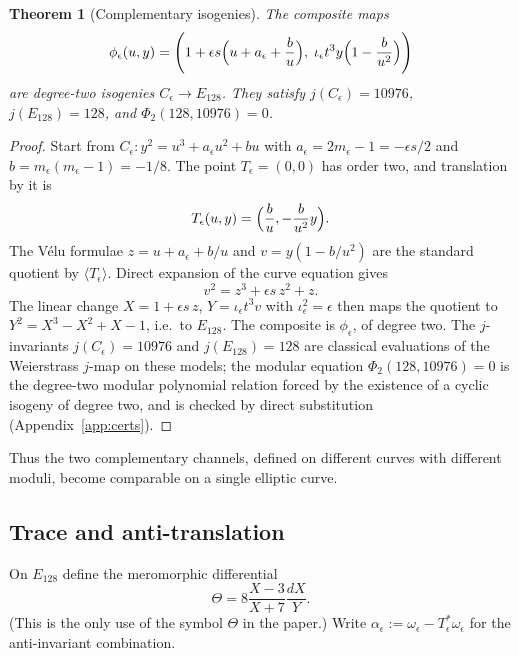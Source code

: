 \documentclass[11pt,a4paper]{article}
\newtheorem{theorem}{Theorem}[section]
\theoremstyle{definition}
\theoremstyle{remark}
\begin{document}
\begin{theorem}[Complementary isogenies]
\label{thm:isogenies}
The composite maps
\begin{equation}
\phi_\epsilon(u,y)
=
\Biggl(
1+\epsilon s\Bigl(u+a_\epsilon+\frac{b}{u}\Bigr),\;
\iota_\epsilon t^3 y\Bigl(1-\frac{b}{u^2}\Bigr)
\Biggr)
\label{eq:phi}
\end{equation}
are degree-two isogenies \(C_\epsilon\to E_{128}\). They satisfy
\(j(C_\epsilon)=10976\), \(j(E_{128})=128\), and \(\Phi_2(128,10976)=0\).
\end{theorem}

\begin{proof}
Start from \(C_\epsilon:y^2=u^3+a_\epsilon u^2+bu\) with
\(a_\epsilon=2m_\epsilon-1=-\epsilon s/2\) and \(b=m_\epsilon(m_\epsilon-1)=-1/8\).
The point \(T_\epsilon=(0,0)\) has order two, and translation by it is
\[
T_\epsilon(u,y)
=
\Bigl(\frac{b}{u},-\frac{b}{u^2}y\Bigr).
\]
The V\'elu formulae \(z=u+a_\epsilon+b/u\) and \(v=y(1-b/u^2)\) are the standard
quotient by \(\langle T_\epsilon\rangle\). Direct expansion of the curve equation
gives
\[
v^2=z^3+\epsilon s\,z^2+z.
\]
The linear change \(X=1+\epsilon s\,z\), \(Y=\iota_\epsilon t^3 v\) with
\(\iota_\epsilon^2=\epsilon\) then maps the quotient to
\(Y^2=X^3-X^2+X-1\), i.e.\ to \(E_{128}\). The composite is \(\phi_\epsilon\), of
degree two. The \(j\)-invariants \(j(C_\epsilon)=10976\) and \(j(E_{128})=128\) are
classical evaluations of the Weierstrass \(j\)-map on these models; the modular
equation \(\Phi_2(128,10976)=0\) is the degree-two modular polynomial relation
forced by the existence of a cyclic isogeny of degree two, and is checked by
direct substitution (Appendix~\ref{app:certs}).
\end{proof}

Thus the two complementary channels, defined on different curves with different
moduli, become comparable on a single elliptic curve.

\subsection{Trace and anti-translation}

On \(E_{128}\) define the meromorphic differential
\begin{equation}
\boxed{
\Theta
=
8\frac{X-3}{X+7}\frac{dX}{Y}.
}
\label{eq:Theta}
\end{equation}
(This is the only use of the symbol \(\Theta\) in the paper.) Write
\(\alpha_\epsilon:=\omega_\epsilon-T_\epsilon^*\omega_\epsilon\) for the
anti-invariant combination.
\end{document}
